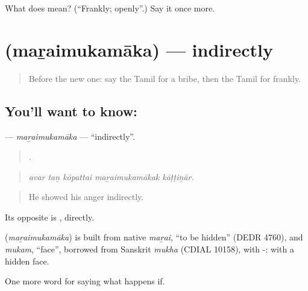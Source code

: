 \begin{tcolorbox}[breakable,colback=teal!4,colframe=teal!35!black,title={Before you move on}]
What does  mean? (\textquotedblleft{}Frankly; openly\textquotedblright{}.) Say it once more.
\end{tcolorbox}
\section[\texorpdfstring{\ta{மறைமுகமாக} (maṟaimukamāka)}{மறைமுகமாக (maṟaimukamāka)}]{ (maṟaimukamāka) — indirectly}

\label{lesson:TA-C392-maraimukamaka}



\begin{quote}
Before the new one: say the Tamil for a bribe, then the Tamil for frankly.
\end{quote}

\subsection*{You'll want to know: }
\textbf{} — \emph{maṟaimukamāka} — \textquotedblleft{}indirectly\textquotedblright{}.

\begin{quote}
    .
\end{quote}

\begin{quote}
\emph{avar taṉ kōpattai maṟaimukamākak kāṭṭiṉār.}
\end{quote}

\begin{quote}
He showed his anger indirectly.
\end{quote}

Its opposite is , directly.

\begin{cousinweb}
\textbf{} (\emph{maṟaimukamāka}) is built from native \emph{maṟai}, \textquotedblleft{}to be hidden\textquotedblright{} (DEDR 4760), and \emph{mukam}, \textquotedblleft{}face\textquotedblright{}, borrowed from Sanskrit \emph{mukha} (CDIAL 10158), with -: with a hidden face.
\end{cousinweb}

\begin{grammarlens}[title={What you've built}]
One more word for saying what happens if.
\end{grammarlens}

